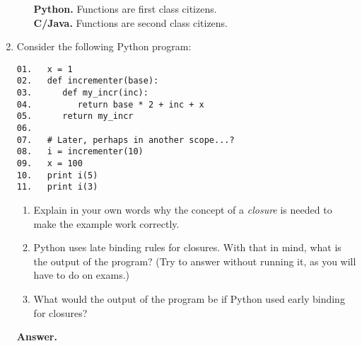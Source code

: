 \documentclass[9pt]{article}
\begin{document}
\begin{enumerate}
\begin{enumerate}
               \textbf{Python.} Functions are first class citizens. \\
               
               \textbf{C/Java.} Functions are second class citizens.
      \end{enumerate}
   \item Consider the following Python program:

         \verb|01.   x = 1| \\
         \verb|02.   def incrementer(base):| \\
         \verb|03.      def my_incr(inc):| \\
         \verb|04.         return base * 2 + inc + x| \\
         \verb|05.      return my_incr| \\
         \verb|06.| \\
         \verb|07.   # Later, perhaps in another scope...?| \\
         \verb|08.   i = incrementer(10)| \\
         \verb|09.   x = 100| \\
         \verb|10.   print i(5)| \\
         \verb|11.   print i(3)|

         \begin{enumerate}
            \item Explain in your own words why the concept of a
                  \textit{closure} is needed to make the example work correctly.
            \item Python uses late binding rules for closures. With that in
                  mind, what is the output of the program? (Try to answer
                  without running it, as you will have to do on exams.)
            \item What would the output of the program be if Python used early
                  binding for closures?
         \end{enumerate}

      \textbf{Answer.}


\end{enumerate}
\end{document}
